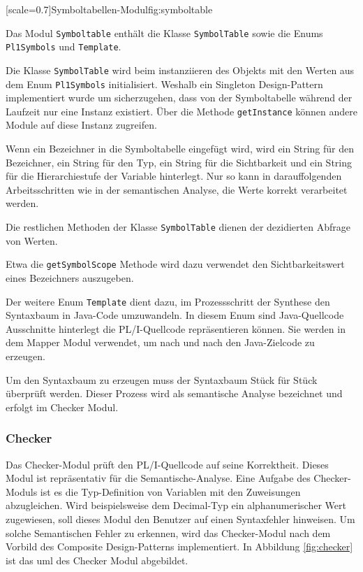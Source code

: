 [scale=0.7]{Symboltabellen-Modul}{fig:symboltable}
\pagebreak

Das Modul \verb+Symboltable+ enthält die Klasse \verb+SymbolTable+
sowie die Enums \verb+Pl1Symbols+ und \verb+Template+.

Die Klasse \verb+SymbolTable+ wird beim instanziieren des Objekts mit den Werten aus dem Enum \verb+Pl1Symbols+ initialisiert. Weshalb ein Singleton Design-Pattern implementiert wurde um sicherzugehen, dass von der Symboltabelle während der Laufzeit nur eine Instanz existiert. 
Über die Methode \verb+getInstance+ können andere Module auf diese Instanz zugreifen.

Wenn ein Bezeichner in die Symboltabelle eingefügt wird, wird ein String für den Bezeichner, ein String für den Typ, ein String für die Sichtbarkeit und ein String für die Hierarchiestufe der Variable hinterlegt. Nur so kann in darauffolgenden Arbeitsschritten wie in der semantischen Analyse, die Werte korrekt verarbeitet werden.

Die restlichen Methoden der Klasse \verb+SymbolTable+ dienen der dezidierten Abfrage von Werten.

Etwa die \verb+getSymbolScope+ Methode wird dazu verwendet den Sichtbarkeitswert eines Bezeichners auszugeben.

Der weitere Enum \verb+Template+ dient dazu, im Prozessschritt der Synthese den Syntaxbaum in Java-Code umzuwandeln.
In diesem Enum sind Java-Quellcode Ausschnitte hinterlegt die PL/I-Quellcode repräsentieren können. Sie werden in dem Mapper Modul verwendet,
um nach und nach den Java-Zielcode zu erzeugen.

Um den Syntaxbaum zu erzeugen muss der Syntaxbaum Stück für Stück überprüft werden. Dieser Prozess wird als semantische Analyse bezeichnet und erfolgt im Checker Modul.
 
 \pagebreak
\subsubsection{Checker}
Das Checker-Modul prüft den PL/I-Quellcode auf seine Korrektheit. 
Dieses Modul ist repräsentativ für die Semantische-Analyse. 
Eine Aufgabe des Checker-Moduls ist es die Typ-Definition von Variablen mit den Zuweisungen abzugleichen.
Wird beispielsweise dem Decimal-Typ ein alphanumerischer Wert zugewiesen, soll dieses Modul den Benutzer auf einen Syntaxfehler hinweisen. Um solche Semantischen Fehler zu erkennen, wird das Checker-Modul nach dem Vorbild des Composite Design-Patterns implementiert. In Abbildung \ref{fig:checker} ist das \ac{uml} des Checker Modul abgebildet.

